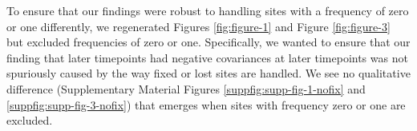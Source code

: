 \documentclass[11pt]{article}
\begin{document}
{{To ensure that our findings were robust to handling sites with a frequency of
zero or one differently, we regenerated Figures \ref{fig:figure-1} and Figure
\ref{fig:figure-3} but excluded frequencies of zero or one. Specifically, we
wanted to ensure that our finding that later timepoints had negative
covariances at later timepoints was not spuriously caused by the way fixed or
lost sites are handled. We see no qualitative difference (Supplementary
Material Figures \ref{suppfig:supp-fig-1-nofix} and
\ref{suppfig:supp-fig-3-nofix}) that emerges when sites with frequency zero or
one are excluded.











}}
\end{document}
